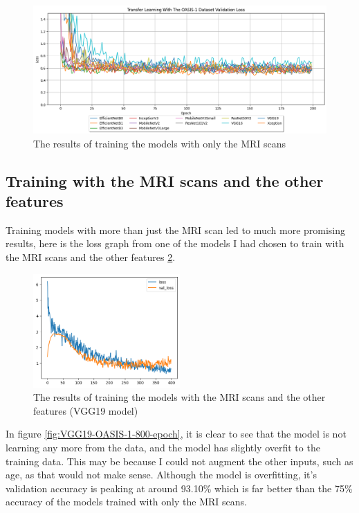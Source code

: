 \documentclass[]{final_report}
\begin{document}
\begin{figure}[ht!]
  \centering
  \includegraphics[width=1\textwidth]{images/OASIS-1-Transfer-Learning-Basic-Results-val-loss.png}
  \caption{The results of training the models with only the MRI scans}
  \label{fig:OASIS-1-Transfer-Learning-Basic-Results-Validation-Loss}
\end{figure}

\subsection{Training with the MRI scans and the other features}

Training models with more than just the MRI scan led to much more promising results, here is the loss graph from one of the models I had chosen to train with the MRI scans and the other features \ref{fig:VGG19-OASIS-1-loss}.

\begin{figure}[ht!]
  \centering
  \includegraphics[width=0.5\textwidth]{images/VGG19-OASIS-1-loss.png}
  \caption{The results of training the models with the MRI scans and the other features (VGG19 model)}
  \label{fig:VGG19-OASIS-1-loss}
\end{figure}

In figure \ref{fig:VGG19-OASIS-1-800-epoch}, it is clear to see that the model is not learning any more from the data, and the model has slightly overfit to the training data. This may be because I could not augment the other inputs, such as age, as that would not make sense. Although the model is overfitting, it's validation accuracy is peaking at around 93.10\% which is far better than the 75\% accuracy of the models trained with only the MRI scans.
\end{document}
